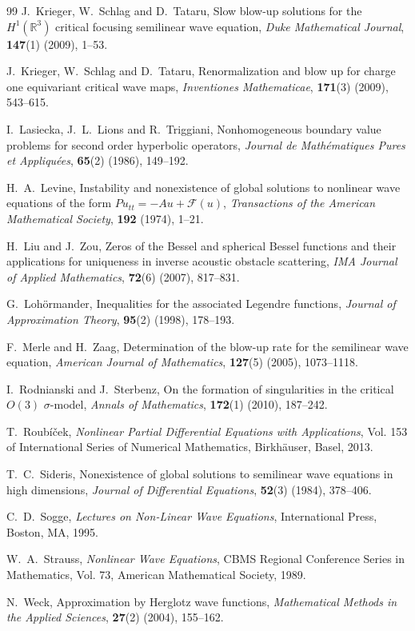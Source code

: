 \documentclass[11pt,reqno,oneside]{amsart}
\numberwithin{equation}{section}
\theoremstyle{definition}
\theoremstyle{remark}
\numberwithin{equation}{section}
\begin{document}
\begin{thebibliography}{99}
	J.~Krieger, W.~Schlag and D.~Tataru, 
	Slow blow-up solutions for the $H^1(\mathbb{R}^3)$ critical focusing semilinear wave equation, 
	\textit{Duke Mathematical Journal}, 
	\textbf{147}(1) (2009), 1--53.
	
	J.~Krieger, W.~Schlag and D.~Tataru, 
	Renormalization and blow up for charge one equivariant critical wave maps, 
	\textit{Inventiones Mathematicae}, 
	\textbf{171}(3) (2009), 543--615.
	
	I.~Lasiecka, J.~L.~Lions and R.~Triggiani, 
	Nonhomogeneous boundary value problems for second order hyperbolic operators, 
	\textit{Journal de Math\'ematiques Pures et Appliqu\'ees}, 
	\textbf{65}(2) (1986), 149--192.
	
	H.~A.~Levine,
	Instability and nonexistence of global solutions to nonlinear wave equations of the form $Pu_{tt} = -Au + \mathcal{F}(u)$,
	\textit{Transactions of the American Mathematical Society},
	\textbf{192} (1974), 1--21.
	
	H.~Liu and J.~Zou, 
	Zeros of the Bessel and spherical Bessel functions and their applications for uniqueness in inverse acoustic obstacle scattering, 
	\textit{IMA Journal of Applied Mathematics}, 
	\textbf{72}(6) (2007), 817--831.
	
	G.~Loh\"ormander, 
	Inequalities for the associated Legendre functions, 
	\textit{Journal of Approximation Theory}, 
	\textbf{95}(2) (1998), 178--193.
	
	F.~Merle and H.~Zaag, 
	Determination of the blow-up rate for the semilinear wave equation, 
	\textit{American Journal of Mathematics}, 
	\textbf{127}(5) (2005), 1073--1118.
	
	I.~Rodnianski and J.~Sterbenz,
	On the formation of singularities in the critical $O(3)$ $\sigma$-model,
	\textit{Annals of Mathematics},
	\textbf{172}(1) (2010), 187--242.
	
	T.~Roubíček, 
	\textit{Nonlinear Partial Differential Equations with Applications}, 
	Vol. 153 of International Series of Numerical Mathematics, 
	Birkhäuser, Basel, 2013.
	
	T.~C.~Sideris, 
	Nonexistence of global solutions to semilinear wave equations in high dimensions, 
	\textit{Journal of Differential Equations}, 
	\textbf{52}(3) (1984), 378--406.
	
	C.~D.~Sogge, 
	\textit{Lectures on Non-Linear Wave Equations}, 
	International Press, Boston, MA, 1995.
	
	W.~A.~Strauss, 
	\textit{Nonlinear Wave Equations}, 
	CBMS Regional Conference Series in Mathematics, Vol. 73, 
	American Mathematical Society, 1989.
	
	N.~Weck, 
	Approximation by Herglotz wave functions, 
	\textit{Mathematical Methods in the Applied Sciences}, 
	\textbf{27}(2) (2004), 155--162.
	
\end{thebibliography}
\end{document}
